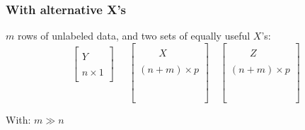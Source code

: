 \documentclass{beamer}
\begin{document}
\begin{frame}
 \frametitle{With alternative X's}

$m$ rows of unlabeled data, and two sets of equally useful $X$'s:
\begin{displaymath}
\begin{array}{c}
\left[\begin{array}{c}
         \quad \\
          Y \\
          \quad \\
          n \times 1 \\
          \quad 
\end{array}
\right] 
\\
\quad\\
\quad\\
\quad\\
\quad
\end{array}
\quad
\left[\begin{array}{c}
         \quad \\
          \quad\quad X \quad\quad \\
          \quad \\
          (n+m) \times p \\
          \quad \\
          \quad \\
          \quad \\
          \quad \\
          \quad \\
\end{array}
\right] 
\quad
\left[\begin{array}{c}
         \quad \\
          \quad\quad Z \quad\quad \\
          \quad \\
          (n+m) \times p \\
          \quad \\
          \quad \\
          \quad \\
          \quad \\
          \quad \\
\end{array}
\right] 
\end{displaymath}

With: $m \gg n$

\end{frame}

\end{document}
